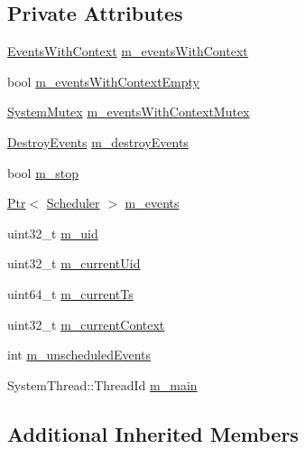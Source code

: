 \subsection*{Private Attributes}
\begin{DoxyCompactItemize}
\item 
\hyperlink{classns3_1_1DefaultSimulatorImpl_a69a45d09d4651865afada01a8713ed38}{Events\+With\+Context} \hyperlink{classns3_1_1DefaultSimulatorImpl_afef52c1fc06adf9ca1afa762f0a0934d}{m\+\_\+events\+With\+Context}
\item 
bool \hyperlink{classns3_1_1DefaultSimulatorImpl_a12b039f82d7326a0a0bcd38dd09c5d2a}{m\+\_\+events\+With\+Context\+Empty}
\item 
\hyperlink{classns3_1_1SystemMutex}{System\+Mutex} \hyperlink{classns3_1_1DefaultSimulatorImpl_a121da8c24078574aa64f0d5a2f47a462}{m\+\_\+events\+With\+Context\+Mutex}
\item 
\hyperlink{classns3_1_1DefaultSimulatorImpl_ab9b6e40c5839c9e5755451f7c5e75406}{Destroy\+Events} \hyperlink{classns3_1_1DefaultSimulatorImpl_a5082b32e009450692e94da134efe07f4}{m\+\_\+destroy\+Events}
\item 
bool \hyperlink{classns3_1_1DefaultSimulatorImpl_a070bd3c9f757f4923dbf0a59c065a5ff}{m\+\_\+stop}
\item 
\hyperlink{classns3_1_1Ptr}{Ptr}$<$ \hyperlink{classns3_1_1Scheduler}{Scheduler} $>$ \hyperlink{classns3_1_1DefaultSimulatorImpl_a68703f6bd4940f4845dbaa49bb679d16}{m\+\_\+events}
\item 
uint32\+\_\+t \hyperlink{classns3_1_1DefaultSimulatorImpl_acb71bb9d73f1819286d4a910ebd03fb4}{m\+\_\+uid}
\item 
uint32\+\_\+t \hyperlink{classns3_1_1DefaultSimulatorImpl_acc741f30f8af775c34e4a97be468c721}{m\+\_\+current\+Uid}
\item 
uint64\+\_\+t \hyperlink{classns3_1_1DefaultSimulatorImpl_a8895b26ba85208a9f933ffa4ffcd92c2}{m\+\_\+current\+Ts}
\item 
uint32\+\_\+t \hyperlink{classns3_1_1DefaultSimulatorImpl_a16a15129f0af0f7f3a3dd7935164be77}{m\+\_\+current\+Context}
\item 
int \hyperlink{classns3_1_1DefaultSimulatorImpl_aac2b46d6d41340194cbd291fbcb5443e}{m\+\_\+unscheduled\+Events}
\item 
System\+Thread\+::\+Thread\+Id \hyperlink{classns3_1_1DefaultSimulatorImpl_ab9fa0ea2495d120f6537699c1dd8784f}{m\+\_\+main}
\end{DoxyCompactItemize}
\subsection*{Additional Inherited Members}


